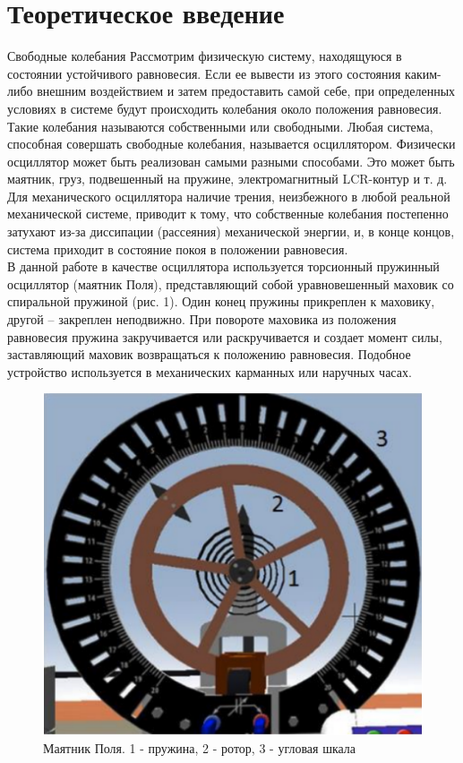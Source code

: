 \documentclass[a4paper]{article}
\begin{document}
\section{\textbf{Теоретическое введение}}
Свободные колебания
Рассмотрим физическую систему, находящуюся в состоянии
устойчивого равновесия. Если ее вывести из этого состояния
каким-либо внешним воздействием и затем предоставить самой
себе, при определенных условиях в системе будут происходить
колебания около положения равновесия. Такие колебания называются собственными или свободными. Любая система, способная совершать свободные колебания, называется осциллятором.
Физически осциллятор может быть реализован самыми разными
способами. Это может быть маятник, груз, подвешенный на пружине, электромагнитный LCR-контур и т. д. Для механического
осциллятора наличие трения, неизбежного в любой реальной механической системе, приводит к тому, что собственные колебания
постепенно затухают из-за диссипации (рассеяния) механической
энергии, и, в конце концов, система приходит в состояние покоя
в положении равновесия.\\
В данной работе в качестве осциллятора используется торсионный пружинный осциллятор (маятник Поля), представляющий собой уравновешенный маховик со спиральной пружиной
(рис. 1). Один конец пружины прикреплен к маховику, другой
– закреплен неподвижно. При повороте маховика из положения
равновесия пружина закручивается или раскручивается и создает
момент силы, заставляющий маховик возвращаться к положению
равновесия. Подобное устройство используется в механических
карманных или наручных часах.
\begin{figure}[H]
	\begin{center}
		\includegraphics[scale=0.3]{pick_1.png}
		\caption{Маятник Поля. 1 - пружина, 2 - ротор, 3 - угловая шкала}
	\end{center}
\end{figure}
\end{document}

